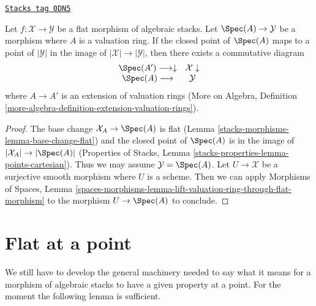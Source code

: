 \begin{lemma}
\label{stacks-morphisms-lemma-lift-valuation-ring-through-flat-morphism}
\href{https://stacks.math.columbia.edu/tag/0DN5}{\texttt{Stacks tag 0DN5}}

Let $f : \mathcal{X} \to \mathcal{Y}$ be a flat morphism
of algebraic stacks. Let $\Spec(A) \to \mathcal{Y}$ be a morphism
where $A$ is a valuation ring. If the closed point of $\Spec(A)$ maps to a
point of $|\mathcal{Y}|$ in the image of $|\mathcal{X|} \to |\mathcal{Y}|$,
then there exists a commutative diagram
$$
\begin{array}{cc}\Spec(A') \longrightarrow\downarrow & \mathcal{X} \downarrow \\ \Spec(A) \longrightarrow & \mathcal{Y}\end{array}
$$
where $A \to A'$ is an extension of valuation rings
(More on Algebra, Definition
\ref{more-algebra-definition-extension-valuation-rings}).
\end{lemma}

\begin{proof}
The base change $\mathcal{X}_A \to \Spec(A)$ is flat
(Lemma \ref{stacks-morphisms-lemma-base-change-flat}) and the closed point of
$\Spec(A)$ is in the image of $|\mathcal{X}_A| \to |\Spec(A)|$
(Properties of Stacks, Lemma \ref{stacks-properties-lemma-points-cartesian}).
Thus we may assume $\mathcal{Y} = \Spec(A)$. Let $U \to \mathcal{X}$
be a surjective smooth morphism where $U$ is a scheme.
Then we can apply Morphisms of Spaces, Lemma
\ref{spaces-morphisms-lemma-lift-valuation-ring-through-flat-morphism}
to the morphism $U \to \Spec(A)$ to conclude.
\end{proof}

\section{Flat at a point}
\label{stacks-morphisms-section-flat-at-point}
We still have to develop the general machinery needed to say what
it means for a morphism of algebraic stacks to have a given property
at a point. For the moment the following lemma is sufficient.

